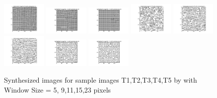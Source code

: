 \documentclass{extarticle}
\theoremstyle{definition}
\theoremstyle{definition}
\begin{document}
\begin{figure}[H]
	\includegraphics[width = 0.19\textwidth]{./figures/Syth_T4_size_11.png}	
	\includegraphics[width = 0.19\textwidth]{./figures/Syth_T4_size_15.png}	
	\includegraphics[width = 0.19\textwidth]{./figures/Syth_T4_size_23.png}
	\includegraphics[width = 0.19\textwidth]{./figures/Syth_T5_size_5.png}
	\includegraphics[width = 0.19\textwidth]{./figures/Syth_T5_size_9.png}
	\includegraphics[width = 0.19\textwidth]{./figures/Syth_T5_size_11.png}
	\includegraphics[width = 0.19\textwidth]{./figures/Syth_T5_size_15.png}
	\includegraphics[width = 0.19\textwidth]{./figures/Syth_T5_size_23.png}
	\caption{Synthesized images for sample images T1,T2,T3,T4,T5 by with Window Size = 5, 9,11,15,23 pixels}
	\label{fig_syth}
\end{figure}
\pagebreak
\end{document}
